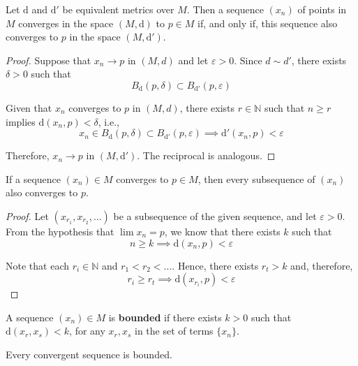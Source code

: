 \begin{proposition}
	Let $\mathrm{d}$ and $\mathrm{d}'$ be equivalent metrics over $M$. Then a sequence $(x_n)$ of points in $M$ converges in the space $(M, \mathrm{d})$ to $p \in M$ if, and only if, this sequence also converges to $p$ in the space $(M, \mathrm{d}')$.
\end{proposition}

\begin{proof}
	Suppose that $x_n \to p$ in $(M,d)$ and let $\varepsilon > 0$. Since $d \sim d'$, there exists $\delta > 0$ such that
	\[
		B_\mathrm{d}(p, \delta) \subset B_{\mathrm{d}'}(p,\varepsilon)
	\]

	Given that $x_n$ converges to $p$ in $(M,d)$, there exists $r \in \mathbb{N}$ such that $n \geq r$ implies $\mathrm{d}(x_n, p) < \delta$, i.e.,
	\[
		x_n \in B_\mathrm{d}(p, \delta) \subset B_{\mathrm{d}'}(p,\varepsilon) \implies \mathrm{d}'(x_n, p) < \varepsilon
	\]

	Therefore, $x_n \to p$ in $(M,\mathrm{d}')$. The reciprocal is analogous.
\end{proof}

\begin{proposition}
	If a sequence $(x_n) \in M$ converges to $p \in M$, then every subsequence of $(x_n)$ also converges to $p$.
\end{proposition}

\begin{proof}
	Let $(x_{r_1}, x_{r_2}, \ldots)$ be a subsequence of the given sequence, and let $\varepsilon > 0$. From the hypothesis that $\lim x_n = p$, we know that there exists $k$ such that
	\[
		n \geq k \implies \mathrm{d}(x_n, p) < \varepsilon
	\]

	Note that each $r_i \in \mathbb{N}$ and $r_1 < r_2 < \ldots$. Hence, there exists $r_t > k$ and, therefore,
	\[
		r_i \geq r_t \implies \mathrm{d}(x_{r_i}, p) < \varepsilon
	\]
\end{proof}

\begin{definition}
	A sequence $(x_n) \in M$ is \textbf{bounded} if there exists $k > 0$ such that $\mathrm{d}(x_r, x_s) < k$, for any $x_r, x_s$ in the set of terms $\{ x_n \}$.
\end{definition}

\begin{proposition}
	Every convergent sequence is bounded.
\end{proposition}

